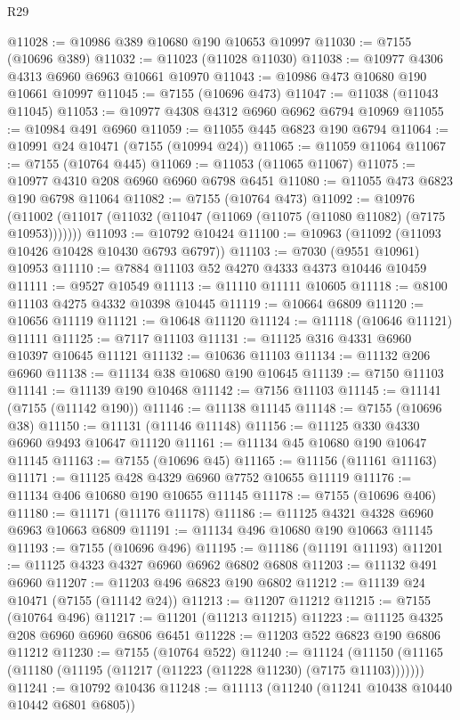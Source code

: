 \begin{lexlean}{R29}
\begin{coremodule}
@11028 := @10986 @389 @10680 @190 @10653 @10997
@11030 := @7155 (@10696 @389)
@11032 := @11023 (@11028 @11030)
@11038 := @10977 @4306 @4313 @6960 @6963 @10661 @10970
@11043 := @10986 @473 @10680 @190 @10661 @10997
@11045 := @7155 (@10696 @473)
@11047 := @11038 (@11043 @11045)
@11053 := @10977 @4308 @4312 @6960 @6962 @6794 @10969
@11055 := @10984 @491 @6960
@11059 := @11055 @445 @6823 @190 @6794
@11064 := @10991 @24 @10471 (@7155 (@10994 @24))
@11065 := @11059 @11064
@11067 := @7155 (@10764 @445)
@11069 := @11053 (@11065 @11067)
@11075 := @10977 @4310 @208 @6960 @6960 @6798 @6451
@11080 := @11055 @473 @6823 @190 @6798 @11064
@11082 := @7155 (@10764 @473)
@11092 := @10976
    (@11002 (@11017 (@11032 (@11047 (@11069 (@11075 (@11080 @11082) (@7175 @10953)))))))
@11093 := @10792 @10424
@11100 := @10963 (@11092 (@11093 @10426 @10428 @10430 @6793 @6797))
@11103 := @7030 (@9551 @10961) @10953
@11110 := @7884 @11103 @52 @4270 @4333 @4373 @10446 @10459
@11111 := @9527 @10549
@11113 := @11110 @11111 @10605
@11118 := @8100 @11103 @4275 @4332 @10398 @10445
@11119 := @10664 @6809
@11120 := @10656 @11119
@11121 := @10648 @11120
@11124 := @11118 (@10646 @11121) @11111
@11125 := @7117 @11103
@11131 := @11125 @316 @4331 @6960 @10397 @10645 @11121
@11132 := @10636 @11103
@11134 := @11132 @206 @6960
@11138 := @11134 @38 @10680 @190 @10645
@11139 := @7150 @11103
@11141 := @11139 @190 @10468
@11142 := @7156 @11103
@11145 := @11141 (@7155 (@11142 @190))
@11146 := @11138 @11145
@11148 := @7155 (@10696 @38)
@11150 := @11131 (@11146 @11148)
@11156 := @11125 @330 @4330 @6960 @9493 @10647 @11120
@11161 := @11134 @45 @10680 @190 @10647 @11145
@11163 := @7155 (@10696 @45)
@11165 := @11156 (@11161 @11163)
@11171 := @11125 @428 @4329 @6960 @7752 @10655 @11119
@11176 := @11134 @406 @10680 @190 @10655 @11145
@11178 := @7155 (@10696 @406)
@11180 := @11171 (@11176 @11178)
@11186 := @11125 @4321 @4328 @6960 @6963 @10663 @6809
@11191 := @11134 @496 @10680 @190 @10663 @11145
@11193 := @7155 (@10696 @496)
@11195 := @11186 (@11191 @11193)
@11201 := @11125 @4323 @4327 @6960 @6962 @6802 @6808
@11203 := @11132 @491 @6960
@11207 := @11203 @496 @6823 @190 @6802
@11212 := @11139 @24 @10471 (@7155 (@11142 @24))
@11213 := @11207 @11212
@11215 := @7155 (@10764 @496)
@11217 := @11201 (@11213 @11215)
@11223 := @11125 @4325 @208 @6960 @6960 @6806 @6451
@11228 := @11203 @522 @6823 @190 @6806 @11212
@11230 := @7155 (@10764 @522)
@11240 := @11124
    (@11150 (@11165 (@11180 (@11195 (@11217 (@11223 (@11228 @11230) (@7175 @11103)))))))
@11241 := @10792 @10436
@11248 := @11113 (@11240 (@11241 @10438 @10440 @10442 @6801 @6805))

\end{coremodule}
\end{lexlean}
